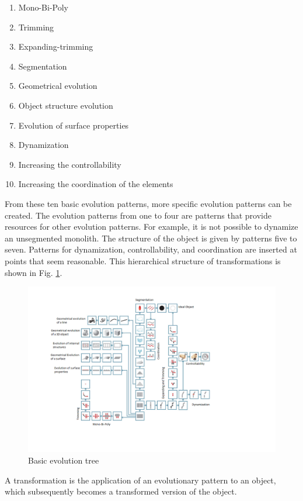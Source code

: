 \documentclass[11pt,a4paper]{article}
\begin{document}
\begin{enumerate}
    \item Mono-Bi-Poly
    \item Trimming
    \item Expanding-trimming
    \item Segmentation
    \item Geometrical evolution
    \item Object structure evolution
    \item Evolution of surface properties
    \item Dynamization
    \item Increasing the controllability
    \item Increasing the coordination of the elements
\end{enumerate}

From these ten basic evolution patterns, more specific evolution patterns can be created. The evolution patterns from one to four are patterns that provide resources for other evolution patterns. For example, it is not possible to dynamize an unsegmented monolith. The structure of the object is given by patterns five to seven. Patterns for dynamization, controllability, and coordination are inserted at points that seem reasonable. This hierarchical structure of transformations is shown in Fig. \ref{fig:basic_evo}.

\begin{figure}[htb]
	\centering
	\includegraphics[width=0.99\linewidth]{figures/basictree.png}
	\caption{\small Basic evolution tree \cite{Shpakovsky2016}}
	\label{fig:basic_evo}
\end{figure}

A transformation is the application of an evolutionary pattern to an object, which subsequently becomes a transformed version of the object.
\end{document}
